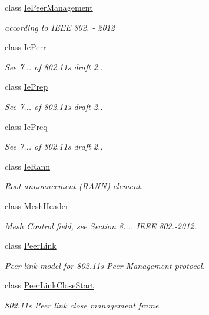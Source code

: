 \begin{DoxyCompactItemize}
class \hyperlink{classns3_1_1dot11s_1_1IePeerManagement}{Ie\+Peer\+Management}
\begin{DoxyCompactList}\small\item\em according to I\+E\+EE 802. -\/ 2012 \end{DoxyCompactList}\item 
class \hyperlink{classns3_1_1dot11s_1_1IePerr}{Ie\+Perr}
\begin{DoxyCompactList}\small\item\em See 7... of 802.\+11s draft 2.. \end{DoxyCompactList}\item 
class \hyperlink{classns3_1_1dot11s_1_1IePrep}{Ie\+Prep}
\begin{DoxyCompactList}\small\item\em See 7... of 802.\+11s draft 2.. \end{DoxyCompactList}\item 
class \hyperlink{classns3_1_1dot11s_1_1IePreq}{Ie\+Preq}
\begin{DoxyCompactList}\small\item\em See 7... of 802.\+11s draft 2.. \end{DoxyCompactList}\item 
class \hyperlink{classns3_1_1dot11s_1_1IeRann}{Ie\+Rann}
\begin{DoxyCompactList}\small\item\em Root announcement (R\+A\+NN) element. \end{DoxyCompactList}\item 
class \hyperlink{classns3_1_1dot11s_1_1MeshHeader}{Mesh\+Header}
\begin{DoxyCompactList}\small\item\em Mesh Control field, see Section 8.... I\+E\+EE 802.-\/2012. \end{DoxyCompactList}\item 
class \hyperlink{classns3_1_1dot11s_1_1PeerLink}{Peer\+Link}
\begin{DoxyCompactList}\small\item\em Peer link model for 802.\+11s Peer Management protocol. \end{DoxyCompactList}\item 
class \hyperlink{classns3_1_1dot11s_1_1PeerLinkCloseStart}{Peer\+Link\+Close\+Start}
\begin{DoxyCompactList}\small\item\em 802.\+11s Peer link close management frame \end{DoxyCompactList}\item 

\end{DoxyCompactItemize}

